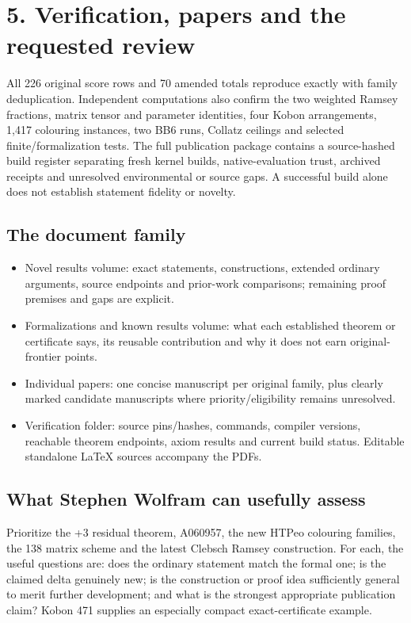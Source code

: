\documentclass[10pt,a4paper]{article}
\begin{document}
\clearpage
\section{5. Verification, papers and the requested review}
All 226 original score rows and 70 amended totals reproduce exactly with family deduplication. Independent computations also confirm the two weighted Ramsey fractions, matrix tensor and parameter identities, four Kobon arrangements, 1,417 colouring instances, two BB6 runs, Collatz ceilings and selected finite/formalization tests. The full publication package contains a source-hashed build register separating fresh kernel builds, native-evaluation trust, archived receipts and unresolved environmental or source gaps. A successful build alone does not establish statement fidelity or novelty.

\subsection{The document family}
\begin{itemize}
\item Novel results volume: exact statements, constructions, extended ordinary arguments, source endpoints and prior-work comparisons; remaining proof premises and gaps are explicit.
\item Formalizations and known results volume: what each established theorem or certificate says, its reusable contribution and why it does not earn original-frontier points.
\item Individual papers: one concise manuscript per original family, plus clearly marked candidate manuscripts where priority/eligibility remains unresolved.
\item Verification folder: source pins/hashes, commands, compiler versions, reachable theorem endpoints, axiom results and current build status. Editable standalone LaTeX sources accompany the PDFs.
\end{itemize}
\subsection{What Stephen Wolfram can usefully assess}
Prioritize the +3 residual theorem, A060957, the new HTPeo colouring families, the 138 matrix scheme and the latest Clebsch Ramsey construction. For each, the useful questions are: does the ordinary statement match the formal one; is the claimed delta genuinely new; is the construction or proof idea sufficiently general to merit further development; and what is the strongest appropriate publication claim? Kobon 471 supplies an especially compact exact-certificate example.
\end{document}
